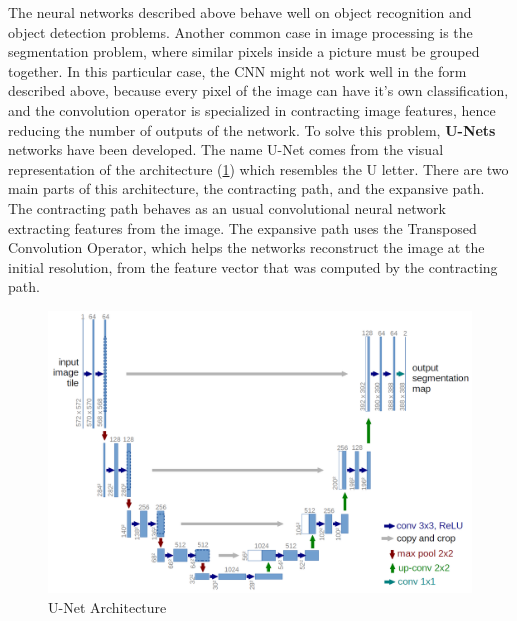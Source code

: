 The neural networks described above behave well on object recognition and object detection problems. Another common case in image processing is the segmentation problem, where similar pixels inside a picture must be grouped together. In this particular case, the CNN might not work well in the form described above, because every pixel of the image can have it's own classification, and the convolution operator is specialized in contracting image features, hence reducing the number of outputs of the network. To solve this problem, \textbf{U-Nets} networks \cite{Unet} have been developed. The name U-Net comes from the visual representation of the architecture (\ref{UnetArchitecture}) which resembles the U letter. There are two main parts of this architecture, the contracting path, and the expansive path. The contracting path behaves as an usual convolutional neural network extracting features from the image. The expansive path uses the Transposed Convolution Operator, which helps the networks reconstruct the image at the initial resolution, from the feature vector that was computed by the contracting path. 

 \begin{figure}[H]
	\includegraphics[width=\textwidth]{Pictures/012Unet.png}
	\caption{U-Net Architecture \cite{Unet}}
	\label{UnetArchitecture}
\end{figure}